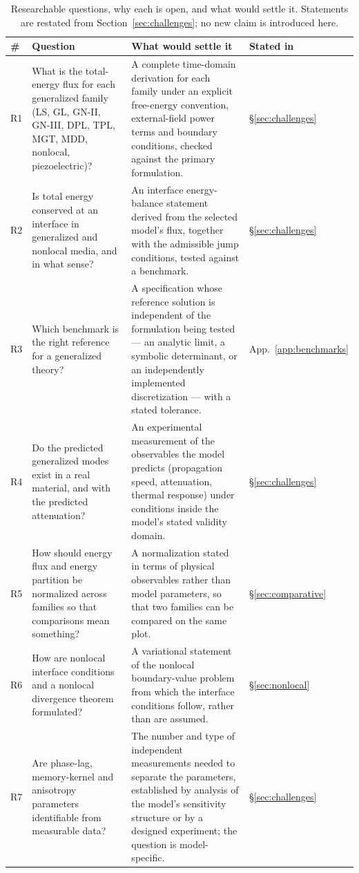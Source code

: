 \begin{table}[H]
\centering
\small
\caption{Researchable questions, why each is open, and what would settle it. Statements are restated from Section~\ref{sec:challenges}; no new claim is introduced here.}
\label{tab:research-questions}
\begin{tabularx}{\textwidth}{@{}p{0.55cm}Y Y p{1.9cm}@{}}
\toprule
\textbf{\#} & \textbf{Question} & \textbf{What would settle it} & \textbf{Stated in} \\
\midrule
R1 & What is the total-energy flux for each generalized family (LS, GL, GN-II, GN-III, DPL, TPL, MGT, MDD, nonlocal, piezoelectric)? & A complete time-domain derivation for each family under an explicit free-energy convention, external-field power terms and boundary conditions, checked against the primary formulation. & \S\ref{sec:challenges} \\
R2 & Is total energy conserved at an interface in generalized and nonlocal media, and in what sense? & An interface energy-balance statement derived from the selected model's flux, together with the admissible jump conditions, tested against a benchmark. & \S\ref{sec:challenges} \\
R3 & Which benchmark is the right reference for a generalized theory? & A specification whose reference solution is independent of the formulation being tested --- an analytic limit, a symbolic determinant, or an independently implemented discretization --- with a stated tolerance. & App.~\ref{app:benchmarks} \\
R4 & Do the predicted generalized modes exist in a real material, and with the predicted attenuation? & An experimental measurement of the observables the model predicts (propagation speed, attenuation, thermal response) under conditions inside the model's stated validity domain. & \S\ref{sec:challenges} \\
R5 & How should energy flux and energy partition be normalized across families so that comparisons mean something? & A normalization stated in terms of physical observables rather than model parameters, so that two families can be compared on the same plot. & \S\ref{sec:comparative} \\
R6 & How are nonlocal interface conditions and a nonlocal divergence theorem formulated? & A variational statement of the nonlocal boundary-value problem from which the interface conditions follow, rather than are assumed. & \S\ref{sec:nonlocal} \\
R7 & Are phase-lag, memory-kernel and anisotropy parameters identifiable from measurable data? & The number and type of independent measurements needed to separate the parameters, established by analysis of the model's sensitivity structure or by a designed experiment; the question is model-specific. & \S\ref{sec:challenges} \\

\end{tabularx}
\end{table}
